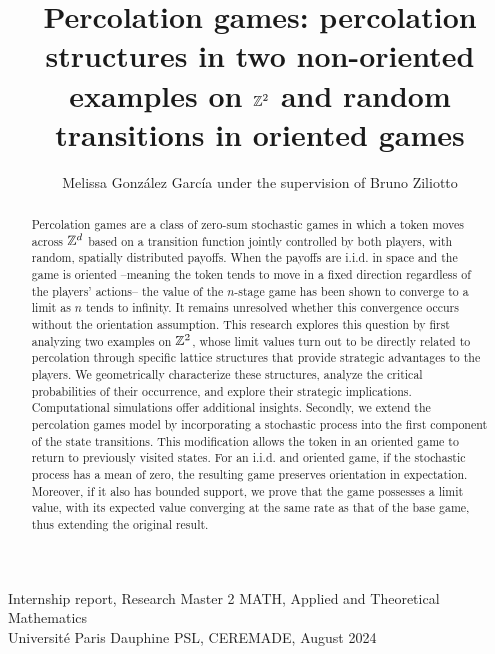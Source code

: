 \documentclass[12pt]{article}
\title{\Large Percolation games: percolation structures in two non-oriented examples on $\mathbb{Z}^2$ and random transitions in oriented games}
\author{Melissa González García under the supervision of Bruno Ziliotto}
\date{}
\begin{document}
	\maketitle
	\vspace{-1.5cm}
	\begin{center}
		Internship report, Research Master 2 MATH, Applied and Theoretical Mathematics\\
	 	Université Paris Dauphine PSL, CEREMADE, August 2024
 	\end{center}
 	

	\vspace{1.0cm}
	\begin{abstract}
		Percolation games are a class of zero-sum stochastic games in which a token moves across $\mathbb{Z}^d$ based on a transition function jointly controlled by both players, with random, spatially distributed payoffs. When the payoffs are i.i.d. in space and the game is oriented --meaning the token tends to move in a fixed direction regardless of the players' actions-- the value of the $n$-stage game has been shown to converge to a limit as $n$ tends to infinity. It remains unresolved whether this convergence occurs without the orientation assumption. This research explores this question by first analyzing two examples on $\mathbb{Z}^2$, whose limit values turn out to be directly related to percolation through specific lattice structures that provide strategic advantages to the players. We geometrically characterize these structures, analyze the critical probabilities of their occurrence, and explore their strategic implications. Computational simulations offer additional insights. Secondly, we extend the percolation games model by incorporating a stochastic process into the first component of the state transitions. This modification allows the token in an oriented game to return to previously visited states. For an i.i.d. and oriented game, if the stochastic process has a mean of zero, the resulting game preserves orientation in expectation. Moreover, if it also has bounded support, we prove that the game possesses a limit value, with its expected value converging at the same rate as that of the base game, thus extending the original result.
	\end{abstract}
	\thispagestyle{empty}

	\newpage
	\tableofcontents

		
		
	
		
	

	\newpage
	
	
\end{document}
